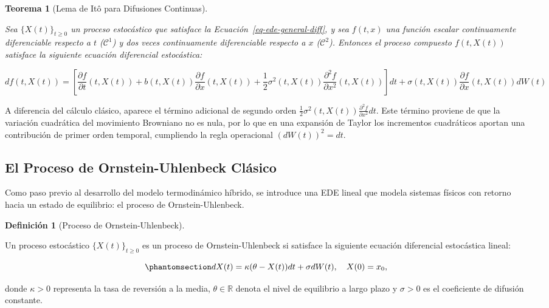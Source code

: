 \documentclass[
  spanish,
  us-letterpaper,
]{scrreprt}
\numberwithin{equation}{section}
\theoremstyle{plain}
\newtheorem{theorem}{Teorema}[chapter]
\theoremstyle{plain}
\theoremstyle{plain}
\theoremstyle{definition}
\newtheorem{definition}{Definición}[chapter]
\theoremstyle{remark}
\begin{document}
\begin{theorem}[Lema de Itô para Difusiones
Continuas]\protect\hypertarget{thm-ito-clasico}{}\label{thm-ito-clasico}

Sea \(\{X(t)\}_{t \ge 0}\) un proceso estocástico que satisface la
Ecuación~\ref{eq-ede-general-diff}, y sea \(f(t, x)\) una función
escalar continuamente diferenciable respecto a \(t\) (\(\mathcal{C}^1\))
y dos veces continuamente diferenciable respecto a \(x\)
(\(\mathcal{C}^2\)). Entonces el proceso compuesto \(f(t, X(t))\)
satisface la siguiente ecuación diferencial estocástica:

\[
df(t, X(t)) = \left[ \frac{\partial f}{\partial t} (t, X(t)) + b(t, X(t))\frac{\partial f}{\partial x} (t, X(t)) + \frac{1}{2}\sigma^2(t, X(t))\frac{\partial^2 f}{\partial x^2} (t, X(t)) \right] dt + \sigma(t, X(t))\frac{\partial f}{\partial x} (t, X(t)) dW(t)
\]

\end{theorem}

A diferencia del cálculo clásico, aparece el término adicional de
segundo orden
\(\frac{1}{2}\sigma^2(t, X(t))\frac{\partial^2 f}{\partial x^2} dt\).
Este término proviene de que la variación cuadrática del movimiento
Browniano no es nula, por lo que en una expansión de Taylor los
incrementos cuadráticos aportan una contribución de primer orden
temporal, cumpliendo la regla operacional \((dW(t))^2 = dt\).

\subsection{El Proceso de Ornstein-Uhlenbeck
Clásico}\label{el-proceso-de-ornstein-uhlenbeck-cluxe1sico}

Como paso previo al desarrollo del modelo termodinámico híbrido, se
introduce una EDE lineal que modela sistemas físicos con retorno hacia
un estado de equilibrio: el proceso de Ornstein-Uhlenbeck.

\begin{definition}[Proceso de
Ornstein-Uhlenbeck]\protect\hypertarget{def-ou-clasico}{}\label{def-ou-clasico}

Un proceso estocástico \(\{X(t)\}_{t \ge 0}\) es un proceso de
Ornstein-Uhlenbeck si satisface la siguiente ecuación diferencial
estocástica lineal:

\begin{equation}\phantomsection\label{eq-ou-clasica}{
dX(t) = \kappa (\theta - X(t)) dt + \sigma dW(t), \quad X(0) = x_0,
}\end{equation}

donde \(\kappa > 0\) representa la tasa de reversión a la media,
\(\theta \in \mathbb{R}\) denota el nivel de equilibrio a largo plazo y
\(\sigma > 0\) es el coeficiente de difusión constante.

\end{definition}
\end{document}
